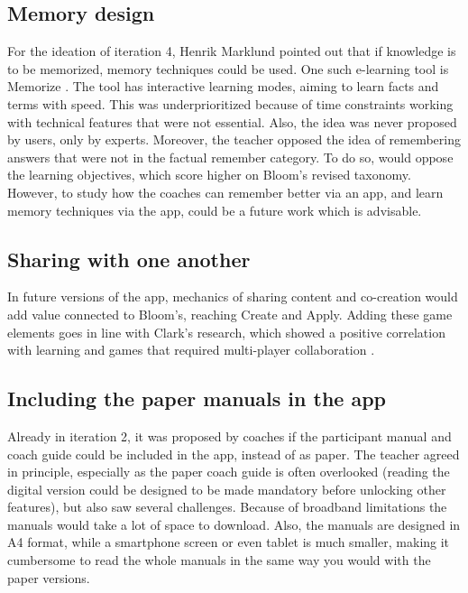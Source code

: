 \subsection{Memory design}
For the ideation of iteration 4, Henrik Marklund pointed out that if knowledge is to be memorized, memory techniques could be used. One such e-learning tool is Memorize \cite{Memorize}. The tool has interactive learning modes, aiming to learn facts and terms with speed. This was underprioritized because of time constraints working with technical features that were not essential. Also, the idea was never proposed by users, only by experts. Moreover, the teacher opposed the idea of remembering answers that were not in the factual remember category. To do so, would oppose the learning objectives, which score higher on Bloom's revised taxonomy. However, to study how the coaches can remember better via an app, and learn memory techniques via the app, could be a future work which is advisable.

\subsection{Sharing with one another}

In future versions of the app, mechanics of sharing content and co-creation would add value connected to Bloom's, reaching Create and Apply. Adding these game elements goes in line with Clark's research, which showed a positive correlation with learning and games that required multi-player collaboration \citep{gates}.


\subsection{Including the paper manuals in the app}

Already in iteration 2, it was proposed by coaches if the participant manual and coach guide could be included in the app, instead of as paper. The teacher agreed in principle, especially as the paper coach guide is often overlooked (reading the digital version could be designed to be made mandatory before unlocking other features), but also saw several challenges.  Because of broadband limitations the manuals would take a lot of space to download. Also, the manuals are designed in A4 format, while a smartphone screen or even tablet is much smaller, making it cumbersome to read the whole manuals in the same way you would with the paper versions.

